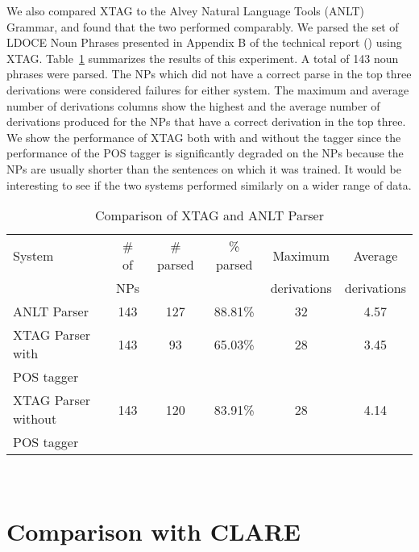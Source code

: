 We also compared XTAG to the Alvey Natural Language Tools (ANLT) Grammar, and
found that the two performed comparably. We parsed the set of LDOCE Noun
Phrases presented in Appendix B of the technical report (\cite{Carroll93})
using XTAG. Table~\ref{Alvey-xtag} summarizes the results of this experiment.
A total of 143 noun phrases were parsed. The NPs which did not have a correct
parse in the top three derivations were considered failures for either
system. The maximum and average number of derivations columns show the highest
and the average number of derivations produced for the NPs that have a correct
derivation in the top three. We show the performance of XTAG both with and
without the tagger since the performance of the POS tagger is significantly
degraded on the NPs because the NPs are usually shorter than the sentences on
which it was trained. It would be interesting to see if the two systems
performed similarly on a wider range of data.

\begin{table}[ht]
\centering
\begin{tabular}{|l|c|c|c|c|c|}  \hline
System & \# of & \# parsed & \% parsed & Maximum & Average \\
& NPs &&& derivations & derivations \\ \hline
ANLT Parser & 143 & 127 & 88.81\% & 32 & 4.57 \\ \hline
XTAG Parser with & 143 & 93 & 65.03\% & 28 & 3.45 \\
POS tagger & & & & & \\ \hline
XTAG Parser without & 143 & 120 & 83.91\% & 28 & 4.14\\
POS tagger & & & & & \\ \hline
\end{tabular} \\

\vspace{0.1in}

\caption{Comparison of XTAG and ANLT
Parser}
\label{Alvey-xtag}
\end{table}



\section{Comparison with CLARE}

